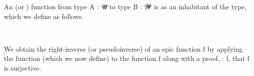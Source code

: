 An  (or ) function from type \ab A \as : \ab 𝓤\af ̇ to type \ab B \as : \ab 𝓦\af ̇ is as an inhabitant of the  type, which we define as follows.
\ccpad
\begin{code}%
\>[0][@{}l@{\AgdaIndent{1}}]%
\>[1]\AgdaSpace{}%
\AgdaSymbol{:}\AgdaSpace{}%
\AgdaSymbol{\{}\AgdaSpace{}%
\AgdaSymbol{:}\AgdaSpace{}%
\AgdaSpace{}%
\AgdaSpace{}%
\AgdaSymbol{\}}\AgdaSpace{}%
\AgdaSymbol{\{}\AgdaSpace{}%
\AgdaSymbol{:}\AgdaSpace{}%
\AgdaSpace{}%
\AgdaSpace{}%
\AgdaSymbol{\}}\AgdaSpace{}%
\AgdaSymbol{(}\AgdaSpace{}%
\AgdaSymbol{:}\AgdaSpace{}%
\AgdaSpace{}%
\AgdaSpace{}%
\AgdaSymbol{)}\AgdaSpace{}%
%
\>[45]\AgdaSpace{}%
\AgdaSpace{}%
\AgdaSpace{}%
\<%
\\
%
\>[1]\AgdaSpace{}%
\AgdaSpace{}%
\AgdaSymbol{=}\AgdaSpace{}%
\AgdaSpace{}%
\AgdaSpace{}%
\AgdaSpace{}%
\AgdaSpace{}%
\AgdaSpace{}%
\AgdaSpace{}%
\<%
\end{code}
\ccpad
We obtain the right-inverse (or pseudoinverse) of an epic function \ab f by applying the function  (which we now define) to the function \ab f along with a proof,  \as :  \ab f, that \ab f is surjective.
\ccpad
\begin{code}%
\>[0][@{}l@{\AgdaIndent{1}}]%
\>[1]\AgdaSpace{}%
\AgdaSymbol{:}%
\>[242I]\AgdaSymbol{\{}\AgdaSpace{}%
\AgdaSymbol{:}\AgdaSpace{}%
\AgdaSpace{}%
\AgdaSpace{}%
\AgdaSymbol{\}}\AgdaSpace{}%
\AgdaSymbol{\{}\AgdaSpace{}%
\AgdaSymbol{:}\AgdaSpace{}%
\AgdaSpace{}%
\AgdaSpace{}%
\AgdaSymbol{\}}\AgdaSpace{}%
\AgdaSymbol{(}\AgdaSpace{}%
\AgdaSymbol{:}\AgdaSpace{}%
\AgdaSpace{}%
\AgdaSpace{}%
\AgdaSymbol{)}\AgdaSpace{}%
\AgdaSpace{}%
\AgdaSpace{}%
\AgdaSpace{}%
\AgdaSpace{}%
\AgdaSpace{}%
\AgdaSpace{}%
\<%
\\
%
\>[1]\AgdaSpace{}%
\AgdaSpace{}%
\AgdaSpace{}%
\AgdaSpace{}%
\AgdaSymbol{=}\AgdaSpace{}%
\AgdaSpace{}%
\AgdaSpace{}%
\AgdaSymbol{(}\AgdaSpace{}%
\AgdaSymbol{)}\<%
\end{code}

